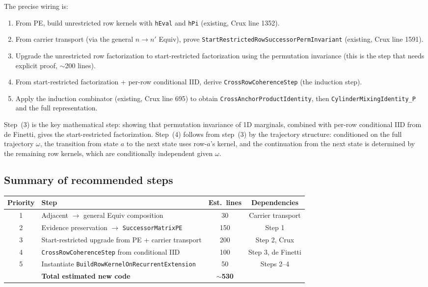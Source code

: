 \documentclass[11pt]{article}
\theoremstyle{definition}
\newcommand{\lean}[1]{\texttt{#1}}
\begin{document}
The precise wiring is:
\begin{enumerate}[leftmargin=2em]
\item From PE, build unrestricted row kernels with
  \lean{hEval} and \lean{hPi} (existing, Crux line 1352).
\item From carrier transport (via the general $n \to n'$ Equiv),
  prove \lean{StartRestrictedRowSuccessorPermInvariant}
  (existing, Crux line 1591).
\item Upgrade the unrestricted row factorization to start-restricted
  factorization using the permutation invariance
  (this is the step that needs explicit proof, $\sim$200 lines).
\item From start-restricted factorization + per-row conditional IID,
  derive \lean{CrossRowCoherenceStep} (the induction step).
\item Apply the induction combinator (existing, Crux line 695)
  to obtain \lean{CrossAnchorProductIdentity}, then
  \lean{CylinderMixingIdentity\_P} and the full representation.
\end{enumerate}

Step~(3) is the key mathematical step: showing that permutation
invariance of 1D marginals, combined with per-row conditional IID
from de Finetti, gives the start-restricted factorization.
Step~(4) follows from step~(3) by the trajectory structure:
conditioned on the full trajectory $\omega$, the
transition from state $a$ to the next state uses row-$a$'s kernel,
and the continuation from the next state is determined by the
remaining row kernels, which are conditionally independent given $\omega$.

\subsection{Summary of recommended steps}

\begin{center}
\small
\begin{tabular}{clcc}
\hline
\textbf{Priority} & \textbf{Step} & \textbf{Est.\ lines} & \textbf{Dependencies} \\
\hline
1 & Adjacent $\to$ general Equiv composition & 30 & Carrier transport \\
2 & Evidence preservation $\to$ \lean{SuccessorMatrixPE} & 150 & Step 1 \\
3 & Start-restricted upgrade from PE + carrier transport & 200 & Step 2, Crux \\
4 & \lean{CrossRowCoherenceStep} from conditional IID & 100 & Step 3, de Finetti \\
5 & Instantiate \lean{BuildRowKernelOnRecurrentExtension} & 50 & Steps 2--4 \\
\hline
& \textbf{Total estimated new code} & \textbf{$\sim$530} & \\
\hline
\end{tabular}
\end{center}
\end{document}
